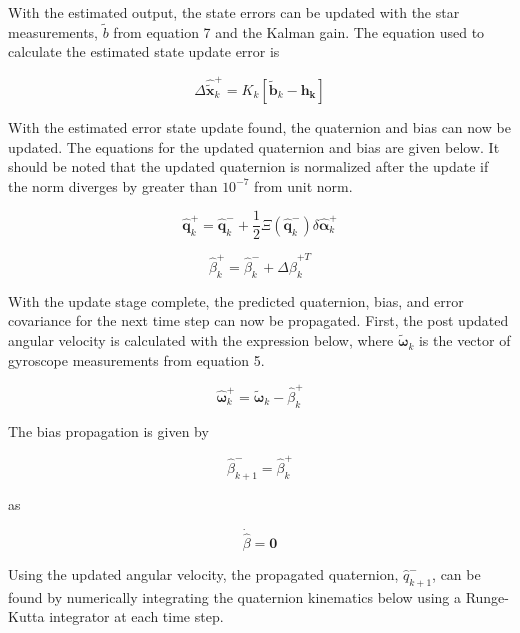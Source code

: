 \documentclass[12pt]{report}
\begin{document}
\noindent With the estimated output, the state errors can be updated with the star measurements, $\tilde{b}$ from equation 7 and the Kalman gain. The equation used to calculate the estimated state update error is

\begin{equation}
	\Delta\pmb{\hat{\tilde{x}}}_k^+ = K_k[\tilde{\pmb{b}}_k - \pmb{h_k}]
\end{equation}

\noindent With the estimated error state update found, the quaternion and bias can now be updated. The equations for the updated quaternion and bias are given below. It should be noted that the updated quaternion is normalized after the update if the norm diverges by greater than $10^{-7}$ from unit norm.

\begin{equation}
	\pmb{\hat{q}}_k^+ = \pmb{\hat{q}}_k^- + \frac{1}{2}\Xi(\hat{\pmb{q}}_k^-)\delta\hat{\pmb{\alpha}}_k^+
\end{equation}

\begin{equation}
	\hat{\beta}_k^+ = \hat{\beta}_k^- + \Delta\hat{\beta}_k^{+T}
\end{equation}

\noindent With the update stage complete, the predicted quaternion, bias, and error covariance for the next time step can now be propagated. First, the post updated angular velocity is calculated with the expression below, where $\tilde{\pmb{\omega}}_k$ is the vector of gyroscope measurements from equation 5. 

\begin{equation}
	\hat{\pmb{\omega}}_k^+ = \tilde{\pmb{\omega}}_k - \hat{\beta}_k^+
\end{equation}

\noindent The bias propagation is given by

\begin{equation}
	\hat{\beta}_{k+1}^- = \hat{\beta}_k^+
\end{equation}

\noindent as 

\begin{equation}
	\dot{\hat{\beta}} = \pmb{0}  
\end{equation}

\noindent Using the updated angular velocity, the propagated quaternion, $\hat{q}_{k+1}^-$, can be found by numerically integrating the quaternion kinematics below using a Runge-Kutta integrator at each time step. 
\end{document}
